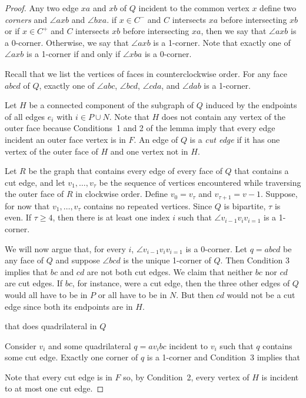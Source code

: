 \documentclass{patmorin}
\begin{document}
\begin{proof}
   Any two edge $xa$ and $xb$ of $Q$ incident to the common vertex
   $x$ define two \emph{corners} and $\angle axb$ and $\angle bxa$.
   if $x\in C^-$ and $C$ intersects $xa$ before intersecting $xb$
   or if $x\in C^+$ and $C$ intersects $xb$ before intersecting $xa$,
   then we say that $\angle axb$ is a 0-corner.  Otherwise, we say that
   $\angle axb$ is a 1-corner.  Note that exactly one of $\angle axb$
   is a 1-corner if and only if $\angle xba$ is a 0-corner.

   Recall that we list the vertices of faces in counterclockwise order.
   For any face $abcd$ of $Q$, exactly one of $\angle abc$, $\angle bcd$,
   $\angle cda$, and $\angle dab$ is a 1-corner.

   Let $H$ be a connected component of the subgraph of $Q$ induced by
   the endpoints of all edges $e_i$ with $i\in P\cup N$.  Note that $H$
   does not contain any vertex of the outer face because Conditions~1 and
   2 of the lemma imply that every edge incident an outer face vertex is
   in $F$.  An edge of $Q$ is a \emph{cut edge} if it has one vertex of 
   the outer face of $H$ and one vertex not in $H$.  

   Let $R$ be the graph that contains every edge of every face of $Q$
   that contains a cut edge, and let $v_1,\ldots,v_\tau$ be the sequence
   of vertices encountered while traversing the outer face of $R$ in
   clockwise order.  Define $v_0=v_\tau$ and $v_{\tau+1}=v-1$.
   Suppose, for now that $v_1,\ldots,v_\tau$ contains
   no repeated vertices.  Since $Q$ is bipartite, $\tau$ is even.
   If $\tau \ge 4$, then there is at least one index $i$ such that
   $\angle v_{i-1}v_{i}v_{i=1}$ is a 1-corner.

   We will now argue that, for every $i$, $\angle v_{i-1}v_{i}v_{i=1}$ is
   a 0-corner. Let $q=abcd$ be any face of $Q$ and suppose $\angle bcd$
   is the unique 1-corner of $Q$.  Then Condition 3 implies that $bc$
   and $cd$ are not both cut edges.  We claim that neither $bc$ nor $cd$
   are cut edges. If $bc$, for instance, were a cut edge, then the three
   other edges of $Q$ would all have to be in $P$ or all have to be in
   $N$. But then $cd$ would not be a cut edge since both its endpoints
   are in $H$.

   



that does  quadrilateral in $Q$


Consider $v_i$ and some quadrilateral $q=av_ibc$ incident to $v_i$ such that $q$ contains some cut edge.  Exactly one corner of $q$ is a 1-corner
 and Condition~3 implies that 


   Note that every cut edge is in $F$
   so, by Condition~2, every vertex of $H$ is incident to at most one
   cut edge.

\end{proof}
\end{document}
